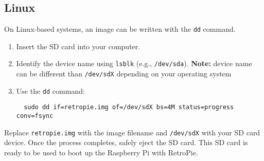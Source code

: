 \subsection{Linux}
\label{subsec:writing_linux}

On Linux-based systems, an image can be written with the \texttt{dd} command.  
\begin{enumerate}
  \item Insert the SD card into your computer.  
  \item Identify the device name using \texttt{lsblk} (e.g., \texttt{/dev/sda}). \textbf{Note:} device name can be different than \texttt{/dev/sdX} depending on your operating system
  \item Use the \texttt{dd} command:  
  \begin{verbatim}
  sudo dd if=retropie.img of=/dev/sdX bs=4M status=progress conv=fsync
  \end{verbatim}   
\end{enumerate}

Replace \texttt{retropie.img} with the image filename and \texttt{/dev/sdX} with your SD card device. Once the process completes, safely eject the SD card. This SD card is ready to be used to boot up the Raspberry Pi with RetroPie. 
